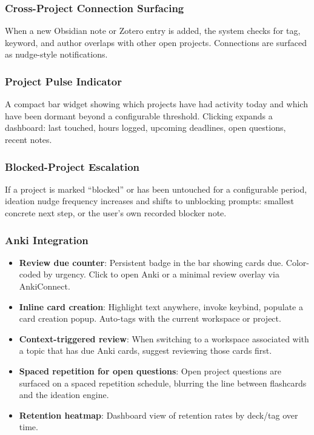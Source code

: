 \documentclass[11pt,a4paper]{article}
\begin{document}
\subsubsection{Cross-Project Connection Surfacing}
When a new Obsidian note or Zotero entry is added, the system checks for tag, keyword, and author overlaps with other open projects. Connections are surfaced as nudge-style notifications.

\subsubsection{Project Pulse Indicator}
A compact bar widget showing which projects have had activity today and which have been dormant beyond a configurable threshold. Clicking expands a dashboard: last touched, hours logged, upcoming deadlines, open questions, recent notes.

\subsubsection{Blocked-Project Escalation}
If a project is marked ``blocked'' or has been untouched for a configurable period, ideation nudge frequency increases and shifts to unblocking prompts: smallest concrete next step, or the user's own recorded blocker note.

\subsubsection{Anki Integration}
\label{sec:features-anki}
\begin{itemize}[leftmargin=1.5em, itemsep=2pt]
  \item \textbf{Review due counter}: Persistent badge in the bar showing cards due. Color-coded by urgency. Click to open Anki or a minimal review overlay via AnkiConnect.
  \item \textbf{Inline card creation}: Highlight text anywhere, invoke keybind, populate a card creation popup. Auto-tags with the current workspace or project.
  \item \textbf{Context-triggered review}: When switching to a workspace associated with a topic that has due Anki cards, suggest reviewing those cards first.
  \item \textbf{Spaced repetition for open questions}: Open project questions are surfaced on a spaced repetition schedule, blurring the line between flashcards and the ideation engine.
  \item \textbf{Retention heatmap}: Dashboard view of retention rates by deck/tag over time.
\end{itemize}
\end{document}
